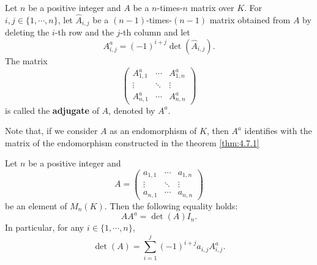 \begin{definitionenv}
    Let $n$ be a positive integer and $A$ be a $n$-times-$n$ matrix over $K$.
    For $i,j \in \{1,\cdots,n\}$, let $\hat{A}_{i,j}$ be a $(n-1)$-times-$(n-1)$ matrix obtained from $A$ by deleting the $i$-th row and the $j$-th column and let
    $$ A^a_{i,j} = (-1)^{i+j}\det (\hat{A}_{i,j}).$$
    The matrix
    $$\begin{pmatrix}
        A^a_{1,1} & \cdots & A^a_{1,n}\\
        \vdots & \ddots & \vdots\\
        A^a_{n,1} & \cdots & A^a_{n,n}
    \end{pmatrix}$$
    is called the \textbf{adjugate} of $A$, denoted by $A^a$.

    \quad Note that, if we consider $A$ as an endomorphism of $K$, then $A^a$ identifies with the matrix of the endomorphism constructed in the theorem \ref{thm:4.7.1}
\end{definitionenv}

\begin{corollaryenv}
    Let $n$ be a positive integer and
    $$A = \begin{pmatrix}
        a_{1,1} & \cdots & a_{1,n}\\
        \vdots & \ddots & \vdots\\
        a_{n,1} & \cdots & a_{n,n}
    \end{pmatrix}$$
    be an element of $M_n(K)$.
    Then the following equality holds:
    $$ AA^a = \det (A) I_n.$$
    In particular, for any $i\in \{1,\cdots,n\}$,
    $$ \det (A) = \sum_{i=1}^{j} (-1)^{i+j} a_{i,j} A^a_{i,j}.$$
\end{corollaryenv}
